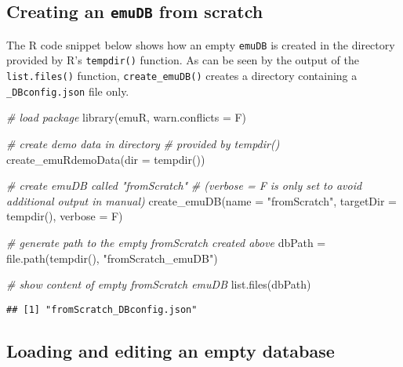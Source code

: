 \documentclass[
]{book}
\newenvironment{Shaded}{\begin{snugshade}}{\end{snugshade}}
\newcommand{\AttributeTok}[1]{\textcolor[rgb]{0.77,0.63,0.00}{#1}}
\newcommand{\CommentTok}[1]{\textcolor[rgb]{0.56,0.35,0.01}{\textit{#1}}}
\newcommand{\FunctionTok}[1]{\textcolor[rgb]{0.00,0.00,0.00}{#1}}
\newcommand{\NormalTok}[1]{#1}
\newcommand{\OtherTok}[1]{\textcolor[rgb]{0.56,0.35,0.01}{#1}}
\newcommand{\StringTok}[1]{\textcolor[rgb]{0.31,0.60,0.02}{#1}}
\begin{document}
\hypertarget{creating-an-emudb-from-scratch}{%
\subsection{\texorpdfstring{Creating an \texttt{emuDB} from scratch}{Creating an emuDB from scratch}}\label{creating-an-emudb-from-scratch}}

The R code snippet below shows how an empty \texttt{emuDB} is created in the directory provided by R's \texttt{tempdir()} function. As can be seen by the output of the \texttt{list.files()} function, \texttt{create\_emuDB()} creates a directory containing a \texttt{\_DBconfig.json} file only.

\begin{Shaded}
\begin{Highlighting}[]
\CommentTok{\# load package}
\FunctionTok{library}\NormalTok{(emuR, }\AttributeTok{warn.conflicts =}\NormalTok{ F)}

\CommentTok{\# create demo data in directory }
\CommentTok{\# provided by tempdir()}
\FunctionTok{create\_emuRdemoData}\NormalTok{(}\AttributeTok{dir =} \FunctionTok{tempdir}\NormalTok{())}

\CommentTok{\# create emuDB called "fromScratch"}
\CommentTok{\# (verbose = F is only set to avoid additional output in manual)}
\FunctionTok{create\_emuDB}\NormalTok{(}\AttributeTok{name =} \StringTok{"fromScratch"}\NormalTok{,}
             \AttributeTok{targetDir =} \FunctionTok{tempdir}\NormalTok{(),}
             \AttributeTok{verbose =}\NormalTok{ F)}

\CommentTok{\# generate path to the empty fromScratch created above}
\NormalTok{dbPath }\OtherTok{=} \FunctionTok{file.path}\NormalTok{(}\FunctionTok{tempdir}\NormalTok{(), }\StringTok{"fromScratch\_emuDB"}\NormalTok{)}

\CommentTok{\# show content of empty fromScratch emuDB}
\FunctionTok{list.files}\NormalTok{(dbPath)}
\end{Highlighting}
\end{Shaded}

\begin{verbatim}
## [1] "fromScratch_DBconfig.json"
\end{verbatim}

\hypertarget{loading-and-editing-an-empty-database}{%
\subsection{Loading and editing an empty database}\label{loading-and-editing-an-empty-database}}
\end{document}
